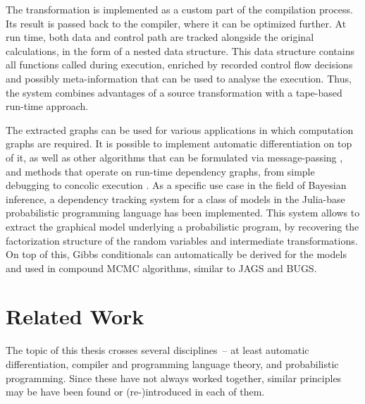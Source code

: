 The transformation is implemented as a custom part of the compilation process.  Its result is passed
back to the compiler, where it can be optimized further. At run time, both data and control path are
tracked alongside the original calculations, in the form of a nested data structure.  This data
structure contains all functions called during execution, enriched by recorded control flow
decisions and possibly meta-information that can be used to analyse the execution. Thus, the system
combines advantages of a source transformation with a tape-based run-time approach.

The extracted graphs can be used for various applications in which computation graphs are required.
It is possible to implement automatic differentiation on top of it, as well as other algorithms that
can be formulated via message-passing \parencite{minka2019automatic,minka2005divergence}, and
methods that operate on run-time dependency graphs, from simple debugging to concolic execution
\parencite{sen2005cute,zeller2019concolic}.  As a specific use case in the field of Bayesian
inference, a dependency tracking system for a class of models in the Julia-base probabilistic
programming language \turingjl{} has been implemented.  This system allows to extract the graphical
model underlying a probabilistic program, by recovering the factorization structure of the random
variables and intermediate transformations.  On top of this, Gibbs conditionals can automatically be
derived for the models and used in compound MCMC algorithms, similar to JAGS and BUGS.


\section{Related Work}
\label{sec:related-work}

The topic of this thesis crosses several disciplines~-- at least automatic differentiation, compiler
and programming language theory, and probabilistic programming.  Since these have not always worked
together, similar principles may be have been found or (re-)introduced in each of them.

